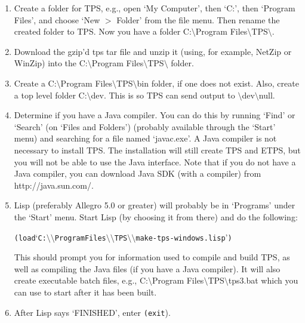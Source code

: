 \begin{enumerate}
\item Create a folder for TPS, e.g., open `My Computer',
then `C:', then `Program Files', and choose `New $>$ Folder'
from the file menu.  Then rename the created folder to
TPS.  Now you have a folder C:$\setminus$Program Files$\setminus$TPS$\setminus$.

\item Download the gzip'd tps tar file and unzip it (using,
for example, NetZip or WinZip) into the C:$\setminus$Program Files$\setminus$TPS$\setminus$
folder.

\item Create a C:$\setminus$Program Files$\setminus$TPS$\setminus$bin folder, if one does not exist.
Also, create a top level folder C:$\setminus$dev.  This is so TPS can
send output to $\setminus$dev$\setminus$null.

\item Determine if you have a Java compiler.  You can do this by running
`Find' or `Search' (on `Files and Folders') (probably available
through the `Start' menu) and searching for a file named `javac.exe'.
A Java compiler is not necessary to install TPS.  The installation
will still create TPS and ETPS, but you will not be able to use the
Java interface.  Note that if you do not have a Java compiler, you can
download Java SDK (with a compiler) from http://java.sun.com/.

\item Lisp (preferably Allegro 5.0 or greater) will probably be in
`Programs' under the `Start' menu.  Start Lisp (by choosing it from
there) and do the following:
\begin{alltt}
(load `C:\(\setminus\setminus\)Program Files\(\setminus\setminus\)TPS\(\setminus\setminus\)make-tps-windows.lisp')
\end{alltt}
This should prompt you for information used to compile and build TPS,
as well as compiling the Java files (if you have a Java compiler).  It
will also create executable batch files, e.g., C:\(\setminus\)Program Files\(\setminus\)TPS\(\setminus\)tps3.bat
which you can use to start {\TPS} after it has been built.

\item After Lisp says `FINISHED', enter {\tt (exit}).
\end{enumerate}

